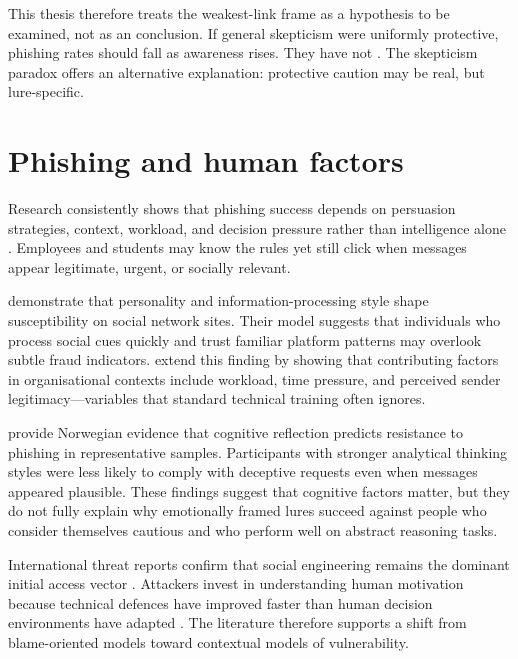 \documentclass[UKenglish,12pt]{master-style}
\begin{document}
This thesis therefore treats the weakest-link frame as a hypothesis to be examined, not as an conclusion. If general skepticism were uniformly protective, phishing rates should fall as awareness rises. They have not \parencite{nsm2026risk,nkomSvindel}. The skepticism paradox offers an alternative explanation: protective caution may be real, but lure-specific.

\section{Phishing and human factors}

Research consistently shows that phishing success depends on persuasion strategies, context, workload, and decision pressure rather than intelligence alone \parencite{parker2020contributing,tsai2021phishing,baylsmith2024phishing}. Employees and students may know the rules yet still click when messages appear legitimate, urgent, or socially relevant.

\textcite{frauenstein2020phishing} demonstrate that personality and information-processing style shape susceptibility on social network sites. Their model suggests that individuals who process social cues quickly and trust familiar platform patterns may overlook subtle fraud indicators. \textcite{parker2020contributing} extend this finding by showing that contributing factors in organisational contexts include workload, time pressure, and perceived sender legitimacy---variables that standard technical training often ignores.

\textcite{tjostheim2020phishing,tjostheim2022crt} provide Norwegian evidence that cognitive reflection predicts resistance to phishing in representative samples. Participants with stronger analytical thinking styles were less likely to comply with deceptive requests even when messages appeared plausible. These findings suggest that cognitive factors matter, but they do not fully explain why emotionally framed lures succeed against people who consider themselves cautious and who perform well on abstract reasoning tasks.

International threat reports confirm that social engineering remains the dominant initial access vector \parencite{enisa2024threat,trendmicro2026phishing,microsoft2024digitaldefense}. Attackers invest in understanding human motivation because technical defences have improved faster than human decision environments have adapted \parencite{hadnagy2018social,conteh2016cybersecurity}. The literature therefore supports a shift from blame-oriented models toward contextual models of vulnerability.
\end{document}
